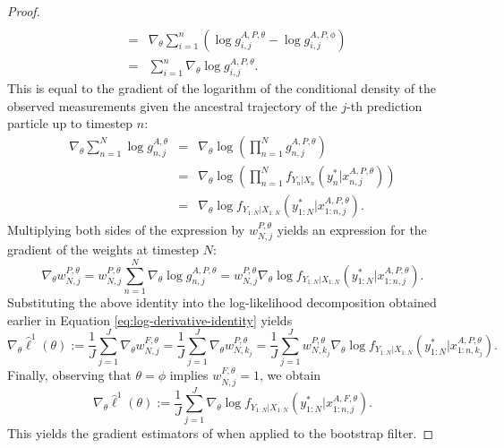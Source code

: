 \begin{proof}
\begin{eqnarray}
 \\
 &=& \nabla_\theta \sum_{i=1}^n \left(\log g_{i,j}^{A,P,\theta} - \log g_{i,j}^{A,P,\phi}\right)
 \\
 &=& \sum_{i=1}^n \nabla_\theta \log g_{i,j}^{A,P,\theta}.
\end{eqnarray}
This is equal to the gradient of the logarithm of the conditional density of the observed measurements given the ancestral trajectory of the $j$-th prediction particle up to timestep $n$:
\begin{eqnarray}  
\nabla_\theta \sum_{n=1}^N \log g_{n,j}^{A,\theta} &=& \nabla_\theta \log\left(\prod_{n=1}^N g_{n,j}^{A,P,\theta}\right) 
\\
&=&  \nabla_\theta \log\left(\prod_{n=1}^N f_{Y_n|X_n}\left(y_n^* | x_{n,j}^{A, P,\theta}\right)\right)
\\
&=& \nabla_\theta \log f_{Y_{1:N}|X_{1:N}}\left(y_{1:N}^* | x_{1:n,j}^{A, P,\theta}\right).
\end{eqnarray}
Multiplying both sides of the expression by $w_{N,j}^{P,\theta} $ yields an expression for the gradient of the weights at timestep $N$:
\begin{equation}
\nabla_\theta w_{N,j}^{P,\theta} = w_{N,j}^{P,\theta} \sum_{n=1}^N \nabla_\theta \log g_{n,j}^{A,P,\theta} = w_{N,j}^{P,\theta} \nabla_\theta \log f_{Y_{1:N}|X_{1:N}}\left(y_{1:N}^* | x_{1:n,j}^{A, P,\theta}\right).    
\end{equation}
Substituting the above identity into the log-likelihood decomposition obtained earlier in Equation \ref{eq:log-derivative-identity} yields
\begin{equation}
    \nabla_\theta \hat{\ell}^1(\theta) := \frac{1}{J}\sum_{j=1}^J \nabla_\theta w_{N,j}^{F,\theta} =\frac{1}{J}\sum_{j=1}^J \nabla_\theta w_{N,k_j}^{P,\theta} = \frac{1}{J}\sum_{j=1}^J w_{N,k_j}^{P,\theta} \nabla_\theta \log f_{Y_{1:N}|X_{1:N}}\left(y_{1:N}^* | x_{1:n,k_j}^{A, P,\theta}\right).
\end{equation}
Finally, observing that $\theta=\phi$ implies $w_{N,j}^{F,\theta}=1$, we obtain 
\begin{equation}
    \nabla_\theta \hat{\ell}^1(\theta) := \frac{1}{J}\sum_{j=1}^J \nabla_\theta \log f_{Y_{1:N}|X_{1:N}}\left(y_{1:N}^* | x_{1:n,j}^{A, F,\theta}\right).
\end{equation}
This yields the gradient estimators of \cite{poyiadjis11, scibior21} when applied to the bootstrap filter. 
\end{proof}

